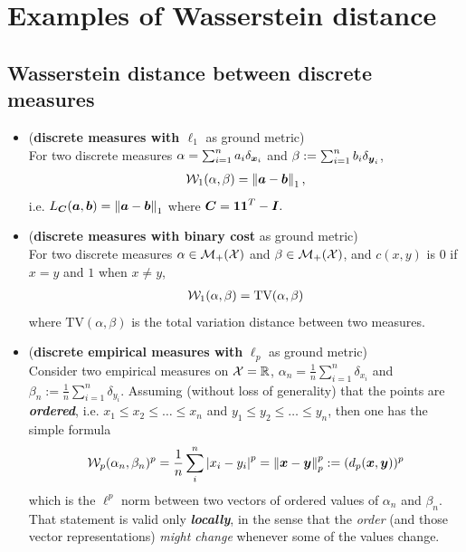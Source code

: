 \documentclass[11pt]{article}
\begin{document}
\section{Examples of Wasserstein distance}
\subsection{Wasserstein distance between discrete measures}
\begin{itemize}
\item (\textbf{discrete measures with $\ell_1$} as ground metric)\\
For two discrete measures $\alpha = \sum_{i=1}^{n}a_i \delta_{\boldsymbol{x}_{i}}$ and $\beta := \sum_{i=1}^{n}b_i \delta_{\boldsymbol{y}_{i}}$,  
\begin{align}
{\mathcal W}_{1}(\alpha, \beta) = \left\|\boldsymbol{a} - \boldsymbol{b}\right\|_{1},  \label{eqn: wass_dist_l1_discrete}
\end{align} i.e. $L_{\boldsymbol{C}}(\boldsymbol{a}, \boldsymbol{b})= \left\|\boldsymbol{a} - \boldsymbol{b}\right\|_{1}$ where $\boldsymbol{C} = \boldsymbol{1}\boldsymbol{1}^{T} - \boldsymbol{I}.$

\item (\textbf{discrete measures with binary cost} as ground metric)\\
For two discrete measures $\alpha \in {\mathcal M}_{+}({\mathcal X})$ and $\beta \in {\mathcal M}_{+}({\mathcal X})$, and $c(x, y)$ is $0$ if $x = y$ and $1$ when $x \neq y$, 
\begin{align*}
{\mathcal W}_{1}(\alpha, \beta) = \text{TV}(\alpha, \beta)
\end{align*} where $\text{TV}(\alpha, \beta)$ is the total variation distance between two measures.

\item (\textbf{discrete empirical measures with }$\ell_p$ as ground metric)\\
Consider two empirical measures on ${\mathcal X} = {\mathbb R}$, $\alpha_{n} = \frac{1}{n}\sum_{i=1}^{n}\delta_{x_{i}}$ and $\beta_{n} := \frac{1}{n}\sum_{i=1}^{n}\delta_{y_{i}}$. Assuming (without loss of generality) that the points are \emph{\textbf{ordered}}, i.e. $x_1 \le x_2 \le \ldots \le x_n$ and $y_1 \le y_2 \le  \ldots  \le y_n$, then one has the simple formula
\begin{align}
{\mathcal W}_{p}(\alpha_{n}, \beta_{n})^{p} =\frac{1}{n} \sum_{i}^{n}\left\lvert x_i - y_i \right\rvert^{p} = \left\|\boldsymbol{x}- \boldsymbol{y}\right\|_{p}^{p} := (d_{p}(\boldsymbol{x}, \boldsymbol{y}))^{p} \label{eqn: wass_dist_lp_discrete}
\end{align} which is the $\ell^{p}$ norm between two vectors of ordered values of $\alpha_n$ and $\beta_n$. That statement is valid only \emph{\textbf{locally}}, in the
sense that the \emph{order} (and those vector representations) \emph{might change} whenever some of the values change. 
\end{itemize}
\end{document}
